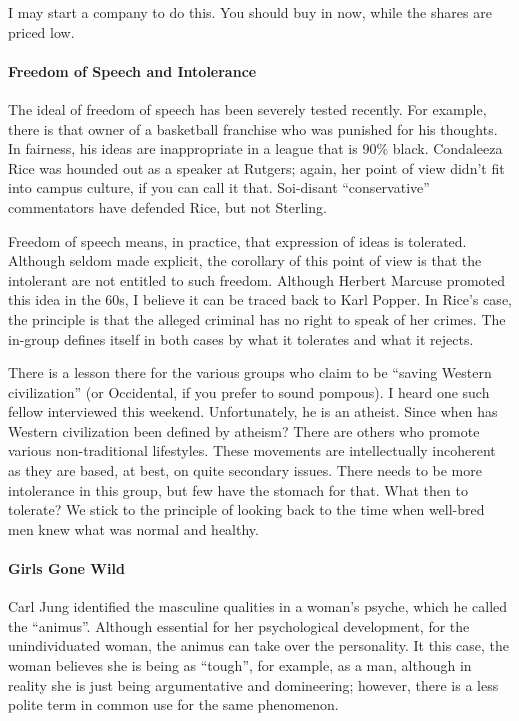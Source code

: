 I may start a company to do this. You should buy in now, while the shares are priced low.

\paragraph{Freedom of Speech and Intolerance}


The ideal of freedom of speech has been severely tested recently. For example, there is that owner of a basketball franchise who was punished for his thoughts. In fairness, his ideas are inappropriate in a league that is 90\% black. Condaleeza Rice was hounded out as a speaker at Rutgers; again, her point of view didn't fit into campus culture, if you can call it that. Soi-disant ``conservative'' commentators have defended Rice, but not Sterling.

Freedom of speech means, in practice, that expression of ideas is tolerated. Although seldom made explicit, the corollary of this point of view is that the intolerant are not entitled to such freedom. Although Herbert Marcuse promoted this idea in the 60s, I believe it can be traced back to Karl Popper. In Rice's case, the principle is that the alleged criminal has no right to speak of her crimes. The in-group defines itself in both cases by what it tolerates and what it rejects.

There is a lesson there for the various groups who claim to be ``saving Western civilization'' (or Occidental, if you prefer to sound pompous). I heard one such fellow interviewed this weekend. Unfortunately, he is an atheist. Since when has Western civilization been defined by atheism? There are others who promote various non-traditional lifestyles. These movements are intellectually incoherent as they are based, at best, on quite secondary issues. There needs to be more intolerance in this group, but few have the stomach for that. What then to tolerate? We stick to the principle of looking back to the time when well-bred men knew what was normal and healthy.

\paragraph{Girls Gone Wild}


Carl Jung identified the masculine qualities in a woman's psyche, which he called the ``animus''. Although essential for her psychological development, for the unindividuated woman, the animus can take over the personality. It this case, the woman believes she is being as ``tough'', for example, as a man, although in reality she is just being argumentative and domineering; however, there is a less polite term in common use for the same phenomenon.

